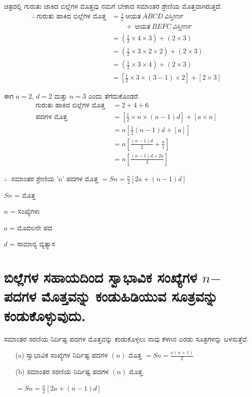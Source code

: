 ಚಿತ್ರದಲ್ಲಿ ಗುರುತು ಜಾಕಿದ ಬಿಲ್ಲೆಗಳ ಮೊತ್ತವು ನಮಗೆ ಬೇಕಾದ ಸಮಾಂತರ ಶ್ರೇಣಿಯ ಮೊತ್ತವಾಗಿರುತ್ತದೆ. 
\begin{align*}
\therefore~ \text{ಗುರುತು ಹಾಕಿದ ಬಿಲ್ಲೆಗಳ ಮೊತ್ತ} & = \frac{1}{2} ~\text{ಆಯತ}~ ABCD ~\text{ವಿಸ್ತೀರ್ಣ}~ \\
& \qquad + ~\text{ಆಯತ}~ BEFC ~\text{ವಿಸ್ತೀರ್ಣ}\\
& = \left(\frac{1}{2} \times 4 \times 3 \right) + (2 \times 3)\\
& = \left(\frac{1}{2} \times 3 \times 2 \times 2\right) + (2 \times 3)\\
& = \left(\frac{1}{2} \times 3 \times 4 \right) + (2 \times 3)\\
& = \left[\frac{1}{2} \times 3 \times (3-1) \times 2 \right]+[2 \times 3]
\end{align*}

ಈಗ $a = 2$, $d = 2$ ಮತ್ತು $n = 3$ ಎಂದು ತೆಗೆದುಕೊಂಡರೆ. 
\begin{align*}
\text{ಗುರುತು ಹಾಕಿದ ಬಿಲ್ಲೆಗಳ ಮೊತ್ತ }   & = 2 + 4 + 6 \\
\text{ಪದಗಳ ಮೊತ್ತ } & = \left[\frac{1}{2} \times n \times (n-1)d \right] + [a \times n]\\
& = n \left[\frac{1}{2} (n - 1)d + [a]\right]\\
& = n \left[\frac{(n-1)d}{2} + \frac{a}{1} \right]\\
& = n \left[\frac{(n-1)d + 2a}{2} \right]
\end{align*}

$\therefore~$ ಸಮಾಂತರ ಶ್ರೇಣಿಯ 'n' ಪದಗಳ ಮೊತ್ತ $= Sn = \frac{n}{2} [2a + (n-1)d]$

$Sn$ = ಮೊತ್ತ

$n$ = ಸಂಖ್ಯೆಗಳು

$a$ = ಮೊದಲನೇ ಪದ

$d$ = ಸಾಮಾನ್ಯ ವ್ಯತ್ಯಾಸ 


\section{ಬಿಲ್ಲೆಗಳ ಸಹಾಯದಿಂದ ಸ್ವಾಭಾವಿಕ ಸಂಖ್ಯೆಗಳ $n$$-$ಪದಗಳ ಮೊತ್ತವನ್ನು ಕಂಡುಹಿಡಿಯುವ ಸೂತ್ರವನ್ನು ಕಂಡುಕೊಳ್ಳುವುದು.}\label{sec3.12}%

ಸಮಾಂತರ ಸರಣಿಯ ನಿರ್ದಿಷ್ಟ ಪದಗಳ ಮೊತ್ತವನ್ನು ಕಂಡುಕೊಳ್ಳಲು ನಾವು ಕೆಳಗಿನ ಎರಡು ಸೂತ್ರಗಳನ್ನು ಬಳಸುತ್ತೆವೆ.
\begin{itemize}
\item [(a)] ಸ್ವಾಭಾವಿಕ ಸಂಖ್ಯೆಗಳ ನಿರ್ದಿಷ್ಟ ಪದಗಳ $(n)$ ಮೊತ್ತ $= Sn = \frac{n(n+1)}{2}$
\item [(b)] ಸಮಾಂತರ ಸರಣಿಯ ನಿರ್ದಿಷ್ಟ ಪದಗಳ $(n)$ ಮೊತ್ತ 

  {\small$= Sn = \frac{n}{2} [2a +(n-1)d]$}
\end{itemize}

